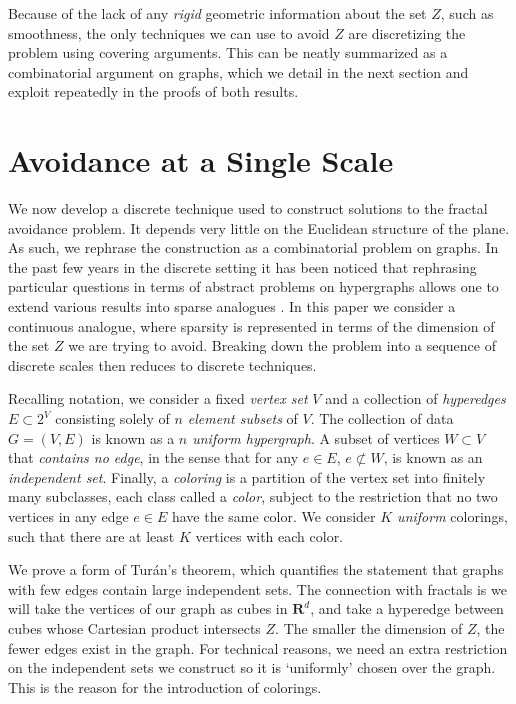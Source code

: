 \documentclass{article}
\theoremstyle{plain}
\theoremstyle{plain}
\begin{document}
\begin{multicols}{2}
Because of the lack of any {\it rigid} geometric information about the set $Z$, such as smoothness, the only techniques we can use to avoid $Z$ are discretizing the problem using covering arguments. This can be neatly summarized as a combinatorial argument on graphs, which we detail in the next section and exploit repeatedly in the proofs of both results.

\section{Avoidance at a Single Scale}

We now develop a discrete technique used to construct solutions to the fractal avoidance problem. It depends very little on the Euclidean structure of the plane. As such, we rephrase the construction as a combinatorial problem on graphs. In the past few years in the discrete setting it has been noticed that rephrasing particular questions in terms of abstract problems on hypergraphs allows one to extend various results into sparse analogues \cite{BaloghMorrisSamotij}. In this paper we consider a continuous analogue, where sparsity is represented in terms of the dimension of the set $Z$ we are trying to avoid. Breaking down the problem into a sequence of discrete scales then reduces to discrete techniques.


Recalling notation, we consider a fixed {\it vertex set} $V$ and a collection of {\it hyperedges} $E \subset 2^V$ consisting solely of {\it $n$ element subsets} of $V$. The collection of data $G = (V,E)$ is known as a {\it $n$ uniform hypergraph}. A subset of vertices $W \subset V$ that {\it contains no edge}, in the sense that for any $e \in E$, $e \not \subset W$, is known as an {\it independent set}. Finally, a {\it coloring} is a partition of the vertex set into finitely many subclasses, each class called a {\it color}, subject to the restriction that no two vertices in any edge $e \in E$ have the same color. We consider {\it $K$ uniform} colorings, such that there are at least $K$ vertices with each color.

We prove a form of Tur\'{a}n's theorem, which quantifies the statement that graphs with few edges contain large independent sets. The connection with fractals is we will take the vertices of our graph as cubes in $\mathbf{R}^d$, and take a hyperedge between cubes whose Cartesian product intersects $Z$. The smaller the dimension of $Z$, the fewer edges exist in the graph. For technical reasons, we need an extra restriction on the independent sets we construct so it is `uniformly' chosen over the graph. This is the reason for the introduction of colorings.


\end{multicols}
\end{document}

